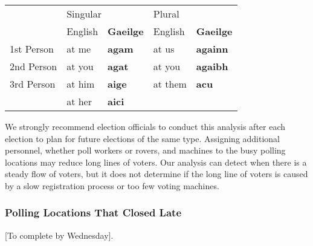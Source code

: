 
\begin{tabular}{|l||l|l||l|l|}
\hline
 &\multicolumn{2}{l|}{Singular}&\multicolumn{2}{l|}{Plural}\\
\cline{2-5}
 &English&\textbf{Gaeilge}&English&\textbf{Gaeilge}\\
\hline\hline
1st Person&at me&\textbf{agam}&at us&\textbf{againn}\\
2nd Person&at you&\textbf{agat}&at you&\textbf{agaibh}\\
3rd Person&at him&\textbf{aige}&at them&\textbf{acu}\\
 &at her&\textbf{aici}& & \\
\hline
\end{tabular}

We strongly recommend election officials to conduct this analysis after each election to plan for future elections of the same type. Assigning additional personnel, whether poll workers or rovers, and machines to the busy polling locations may reduce long lines of voters.  Our analysis can detect when there is a steady flow of voters, but it does not determine if the long line of voters is caused by a slow registration process or too few voting machines.

\subsubsection{Polling Locations That Closed Late}
[To complete by Wednesday].
